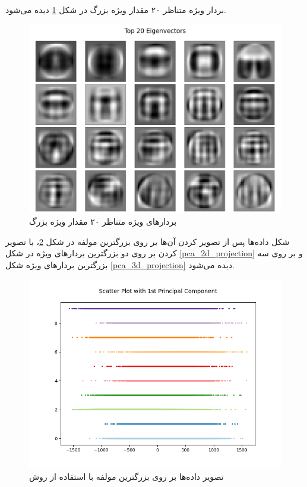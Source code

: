 \documentclass[12pt, a4paper]{article}
\begin{document}
بردار ويژه متناظر ۲۰ مقدار ویژه بزرگ در شکل \ref{q4-eigenvectors} دیده می‌شود.

\begin{figure}[h]
    \centering
    \includegraphics[width=0.7\linewidth]{images/q4/a/eigenvectors.png}
    \caption{بردار‌های ویژه متناظر ۲۰ مقدار ویژه بزرگ}
    \label{q4-eigenvectors}
\end{figure}

شکل داده‌ها پس از تصویر کردن آن‌ها بر روی بزرگترین مولفه در شکل
\ref{pca_1d_projection}، با تصویر کردن بر روی دو بزرگترین بردار‌های ویژه
در شکل \ref{pca_2d_projection} و بر روی سه بزرگترین بردار‌های ویژه
شکل \ref{pca_3d_projection} دیده می‌شود.

\begin{figure}[h]
    \centering
    \includegraphics[width=0.7\linewidth]{images/q4/a/projection_to_1d.png}
    \caption{تصویر داده‌ها بر روی بزرگترین مولفه با استفاده از روش }
    \label{pca_1d_projection}
\end{figure}
\end{document}
